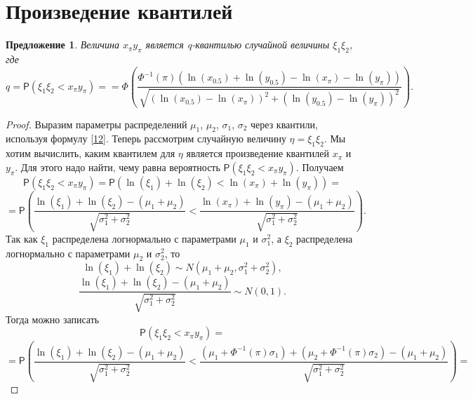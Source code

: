 \documentclass[specialist, substylefile = spbu.rtx,
subf,href,colorlinks=true, 12pt]{disser}
\newtheorem{proposition}[theorem]{Предложение}
\begin{document}
	\section{Произведение квантилей}
	\begin{proposition}\label{pr8}
		Величина $x_{\pi}y_{\pi}$ является q-квантилью случайной величины $\xi_{1}\xi_{2}$, где
		\begin{equation}
			q = \mathsf{P}(\xi_{1}\xi_{2}< x_{\pi}y_{\pi})= =\Phi\left(\frac{\Phi^{-1}(\pi)(\ln(x_{0.5})+\ln(y_{0.5})-\ln(x_{\pi})-\ln(y_{\pi}))}{\sqrt{(\ln(x_{0.5})-\ln(x_{\pi}))^{2}+(\ln(y_{0.5})-\ln(y_{\pi}))^{2}}}\right). \label{n1}
		\end{equation} 
	\end{proposition}
	\begin{proof}
		Выразим параметры распределений $\mu_{1}$, $\mu_{2}$, $\sigma_{1}$, $\sigma_{2}$ через квантили, используя формулу \eqref{12}. Теперь рассмотрим случайную величину $\eta = \xi_{1}\xi_{2}$. Мы хотим вычислить, каким квантилем для $\eta$ является произведение квантилей $x_{\pi}$ и $y_{\pi}$. Для этого надо найти, чему равна вероятность $\mathsf{P}(\xi_{1}\xi_{2}< x_{\pi}y_{\pi})$. Получаем
		\begin{equation*}
			\mathsf{P}(\xi_{1}\xi_{2}< x_{\pi}y_{\pi}) = \mathsf{P}(\ln(\xi_{1})+\ln(\xi_{2})<\ln(x_{\pi})+\ln(y_{\pi}))=
		\end{equation*}
		\begin{equation*}
			=\mathsf{P}\left(\displaystyle{\frac{\ln(\xi_{1})+\ln(\xi_{2})-(\mu_{1}+\mu_{2})}{\sqrt{\sigma_{1}^{2}+\sigma_{2}^{2}}}}<\displaystyle{\frac{\ln(x_{\pi})+\ln(y_{\pi})-(\mu_{1}+\mu_{2})}{\sqrt{\sigma_{1}^{2}+\sigma_{2}^{2}}}}\right).
		\end{equation*}
		Так как $\xi_{1}$ распределена логнормально с параметрами $\mu_{1}$ и $\sigma_{1}^{2}$, а $\xi_{2}$ распределена логнормально с параметрами $\mu_{2}$ и $\sigma_{2}^{2}$, то
		\begin{equation*} 
			\ln(\xi_{1})+\ln(\xi_{2})\sim N(\mu_{1}+\mu_{2}, \sigma_{1}^{2}+\sigma_{2}^{2}),
		\end{equation*}
		\begin{equation*}
			\frac{\ln(\xi_{1})+\ln(\xi_{2})-(\mu_{1}+\mu_{2})}{\sqrt{\sigma_{1}^{2}+\sigma_{2}^{2}}} \sim N(0,1).
		\end{equation*}
		Тогда можно записать
		\begin{equation*}
			\mathsf{P}(\xi_{1}\xi_{2}< x_{\pi}y_{\pi}) =
		\end{equation*}
		\begin{equation*}
			=\mathsf{P}\left(\displaystyle{\frac{\ln(\xi_{1})+\ln(\xi_{2})-(\mu_{1}+\mu_{2})}{\sqrt{\sigma_{1}^{2}+\sigma_{2}^{2}}}}<\displaystyle{\frac{(\mu_{1}+\Phi^{-1}(\pi)\sigma_{1})+(\mu_{2}+\Phi^{-1}(\pi)\sigma_{2})-(\mu_{1}+\mu_{2})}{\sqrt{\sigma_{1}^{2}+\sigma_{2}^{2}}}}\right)=
		\end{equation*}
		

\end{proof}
\end{document}
